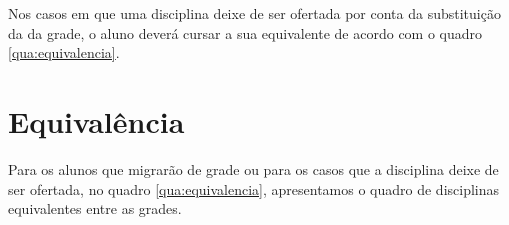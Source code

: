 Nos casos em que uma disciplina deixe de ser ofertada por conta da substituição da da grade, o aluno deverá cursar a sua equivalente de acordo com o quadro  \ref{qua:equivalencia}.\\


\section{Equivalência}

Para os alunos que migrarão de grade ou para os casos que a disciplina deixe de ser ofertada, no quadro \ref{qua:equivalencia}, apresentamos o quadro de disciplinas equivalentes entre as grades.

